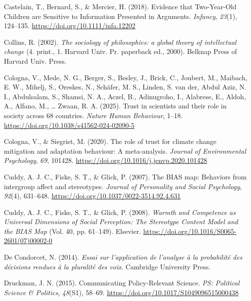 \documentclass[
  jou,
  floatsintext,
  longtable,
  nolmodern,
  notxfonts,
  notimes,
  colorlinks=true,linkcolor=blue,citecolor=blue,urlcolor=blue]{apa7}
\newlength{\cslhangindent}
\newenvironment{CSLReferences}[2] %
 {\begin{list}{}{%
  \setlength{\itemindent}{0pt}
  \setlength{\leftmargin}{0pt}
  \setlength{\parsep}{0pt}
  \ifodd #1
   \setlength{\leftmargin}{\cslhangindent}
   \setlength{\itemindent}{-1\cslhangindent}
  \fi
  \setlength{\itemsep}{#2\baselineskip}}}
 {\end{list}}
\begin{document}
\begin{CSLReferences}{1}{0}
Castelain, T., Bernard, S., \& Mercier, H. (2018). Evidence that
Two{-}Year{-}Old Children are Sensitive to Information Presented in
Arguments. \emph{Infancy}, \emph{23}(1), 124--135.
\url{https://doi.org/10.1111/infa.12202}

Collins, R. (2002). \emph{The sociology of philosophies: a global theory
of intellectual change} (4. print., 1. Harvard Univ. Pr. paperback ed.,
2000). Belknap Press of Harvard Univ. Press.

Cologna, V., Mede, N. G., Berger, S., Besley, J., Brick, C., Joubert,
M., Maibach, E. W., Mihelj, S., Oreskes, N., Schäfer, M. S., Linden, S.
van der, Abdul Aziz, N. I., Abdulsalam, S., Shamsi, N. A., Aczel, B.,
Adinugroho, I., Alabrese, E., Aldoh, A., Alfano, M., \ldots{} Zwaan, R.
A. (2025). Trust in scientists and their role in society across 68
countries. \emph{Nature Human Behaviour}, 1--18.
\url{https://doi.org/10.1038/s41562-024-02090-5}

Cologna, V., \& Siegrist, M. (2020). The role of trust for climate
change mitigation and adaptation behaviour: A meta-analysis.
\emph{Journal of Environmental Psychology}, \emph{69}, 101428.
\url{https://doi.org/10.1016/j.jenvp.2020.101428}

Cuddy, A. J. C., Fiske, S. T., \& Glick, P. (2007). The BIAS map:
Behaviors from intergroup affect and stereotypes. \emph{Journal of
Personality and Social Psychology}, \emph{92}(4), 631--648.
\url{https://doi.org/10.1037/0022-3514.92.4.631}

Cuddy, A. J. C., Fiske, S. T., \& Glick, P. (2008). \emph{Warmth and
Competence as Universal Dimensions of Social Perception: The Stereotype
Content Model and the BIAS Map} (Vol. 40, pp. 61--149). Elsevier.
\url{https://doi.org/10.1016/S0065-2601(07)00002-0}

De Condorcet, N. (2014). \emph{Essai sur l'application de l'analyse à la
probabilité des décisions rendues à la pluralité des voix}. Cambridge
University Press.

Druckman, J. N. (2015). Communicating Policy-Relevant Science. \emph{PS:
Political Science \& Politics}, \emph{48}(S1), 58--69.
\url{https://doi.org/10.1017/S1049096515000438}


\end{CSLReferences}
\end{document}
